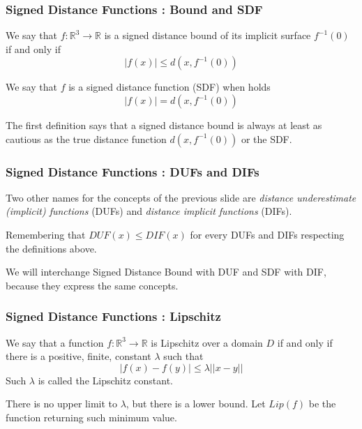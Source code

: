 \documentclass{beamer}
\newcommand{\abs}[1]{\lvert #1 \lvert}
\newcommand{\norm}[1]{\lvert\lvert #1 \lvert\lvert}
\newcommand\R{\ensuremath{\mathbb{R}}}
\begin{document}
\begin{frame}
\frametitle{Signed Distance Functions : Bound and SDF}
\begin{definition}
We say that $f: \R^3 \to \R$ is a signed distance bound of its implicit surface $f^{-1}(0)$ if and only if
\begin{equation}\label{eq:sdb}
\abs{f(x)} \leq d(x,f^{-1}(0))
\end{equation}
\end{definition}

\begin{definition}
We say that $f$ is a signed distance function (SDF) when holds
\begin{equation}\label{eq:sdf}
\abs{f(x)} = d(x,f^{-1}(0))
\end{equation}
\end{definition}

The first definition says that a signed distance bound is always at least as cautious as the true distance function $d(x,f^{-1}(0))$ or the SDF.
\end{frame}

\begin{frame}
\frametitle{Signed Distance Functions : DUFs and DIFs}
Two other names for the concepts of the previous slide are
\emph{distance underestimate (implicit) functions} (DUFs) and 
\emph{distance implicit functions} (DIFs).

Remembering that $DUF(x) \leq DIF(x)$ for every DUFs and DIFs respecting the definitions above.

We will interchange Signed Distance Bound with DUF and SDF with DIF, because they express the same concepts.
\end{frame}


\begin{frame}
\frametitle{Signed Distance Functions : Lipschitz}
\begin{definition}
We say that a function $f : \R^3 \to \R$ is Lipschitz over a domain $D$ if and only if there is a positive, finite, constant $\lambda$ such that
\begin{equation}\label{eq:lip_fun}
\abs{f(x) - f(y)} \leq \lambda \norm{x - y}
\end{equation}
Such $\lambda$ is called the Lipschitz constant.
\end{definition}

There is no upper limit to $\lambda$, but there is a lower bound.
Let $Lip(f)$ be the function returning such minimum value.
\end{frame}
\end{document}
